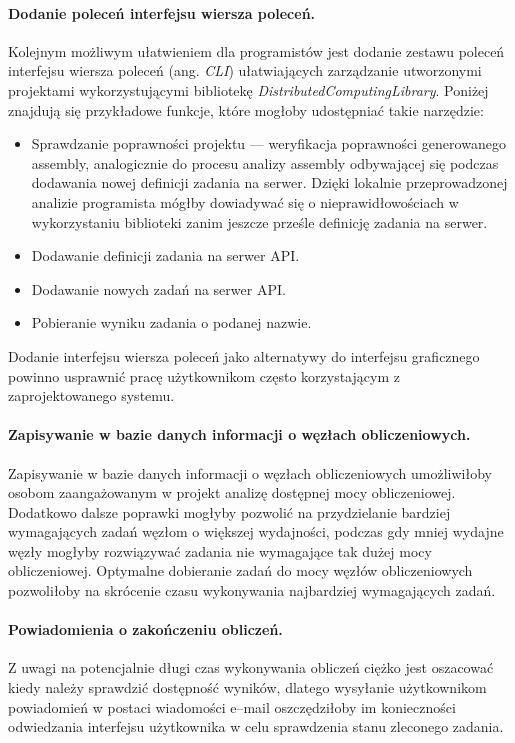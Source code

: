 \documentclass[a4paper,11pt,twoside]{report}
\theoremstyle{definition}
\begin{document}
        \paragraph{Dodanie poleceń interfejsu wiersza poleceń.}
        Kolejnym możliwym ułatwieniem dla programistów jest dodanie zestawu poleceń interfejsu wiersza poleceń (ang. \textit{CLI}) ułatwiających zarządzanie utworzonymi projektami wykorzystującymi bibliotekę \textit{DistributedComputingLibrary}. Poniżej znajdują się przykładowe funkcje, które mogłoby udostępniać takie narzędzie:
        
        \begin{itemize}
            \item Sprawdzanie poprawności projektu --- weryfikacja poprawności generowanego assembly, analogicznie do procesu analizy assembly odbywającej się podczas dodawania nowej definicji zadania na serwer. Dzięki lokalnie przeprowadzonej analizie programista mógłby dowiadywać się o nieprawidłowościach w wykorzystaniu biblioteki zanim jeszcze prześle definicję zadania na serwer.
            \item Dodawanie definicji zadania na serwer API.
            \item Dodawanie nowych zadań na serwer API.
            \item Pobieranie wyniku zadania o podanej nazwie.
        \end{itemize}
        
        Dodanie interfejsu wiersza poleceń jako alternatywy do interfejsu graficznego powinno usprawnić pracę użytkownikom często korzystającym z zaprojektowanego systemu.
        
        \paragraph{Zapisywanie w bazie danych informacji o węzłach obliczeniowych.}
        Zapisywanie w bazie danych informacji o węzłach obliczeniowych umożliwiłoby osobom zaangażowanym w projekt analizę dostępnej mocy obliczeniowej. 
        Dodatkowo dalsze poprawki mogłyby pozwolić na przydzielanie bardziej wymagających zadań węzłom o większej wydajności, podczas gdy mniej wydajne węzły mogłyby rozwiązywać zadania nie wymagające tak dużej mocy obliczeniowej.
        Optymalne dobieranie zadań do mocy węzłów obliczeniowych pozwoliłoby na skrócenie czasu wykonywania najbardziej wymagających zadań.
        
        \paragraph{Powiadomienia o zakończeniu obliczeń.}
        Z uwagi na potencjalnie długi czas wykonywania obliczeń ciężko jest oszacować kiedy należy sprawdzić dostępność wyników, dlatego wysyłanie użytkownikom powiadomień w postaci wiadomości e--mail oszczędziłoby im konieczności odwiedzania interfejsu użytkownika w celu sprawdzenia stanu zleconego zadania.
        
\end{document}
